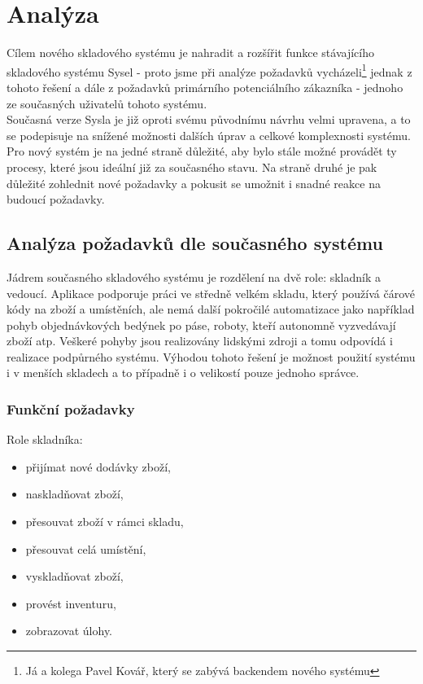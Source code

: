 \chapter{Analýza}

Cílem nového skladového systému je nahradit a rozšířit funkce stávajícího skladového systému Sysel - proto jsme při analýze požadavků vycházeli\footnote{Já a kolega Pavel Kovář, který se zabývá backendem nového systému} jednak z tohoto řešení a dále z požadavků primárního potenciálního zákazníka - jednoho ze současných uživatelů tohoto systému.\\
Současná verze Sysla je již oproti svému původnímu návrhu velmi upravena, a to se podepisuje na snížené možnosti dalších úprav a celkové komplexnosti systému.\\
Pro nový systém je na jedné straně důležité, aby bylo stále možné provádět ty procesy, které jsou ideální již za současného stavu. Na straně druhé je pak důležité zohlednit nové požadavky a pokusit se umožnit i snadné reakce na budoucí požadavky.


\section{Analýza požadavků dle současného systému}

Jádrem současného skladového systému je rozdělení na dvě role: skladník a vedoucí. Aplikace podporuje práci ve středně velkém skladu, který používá čárové kódy na zboží a umístěních, ale nemá další pokročilé automatizace jako například pohyb objednávkových bedýnek po páse, roboty, kteří autonomně vyzvedávají zboží atp. Veškeré pohyby jsou realizovány lidskými zdroji a tomu odpovídá i realizace podpůrného systému. Výhodou tohoto řešení je možnost použití systému i v menších skladech a to případně i o velikostí pouze jednoho správce.\\

\subsection{Funkční požadavky}

Role skladníka:
\begin{itemize}
	\item přijímat nové dodávky zboží,
	\item naskladňovat zboží,
	\item přesouvat zboží v rámci skladu,
	\item přesouvat celá umístění,
	\item vyskladňovat zboží,
	\item provést inventuru,
	\item zobrazovat úlohy.
\end{itemize}

